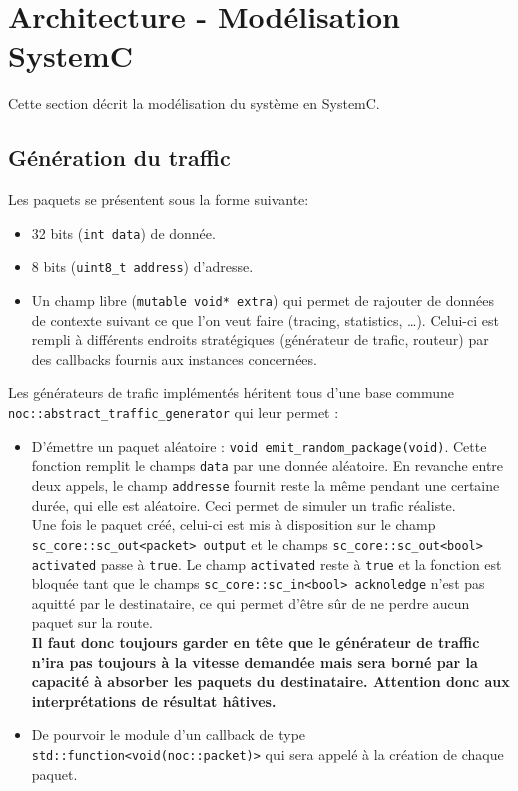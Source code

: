 \section{Architecture - Modélisation SystemC}

Cette section décrit la modélisation du système en SystemC.

\subsection{Génération du traffic}

Les paquets se présentent sous la forme suivante:
\begin{itemize}
  \item 32 bits (\texttt{int data}) de donnée.
  \item 8 bits (\texttt{uint8\_t address}) d'adresse.
  \item Un champ libre (\texttt{mutable void* extra}) qui permet de rajouter de
    données de contexte suivant ce que l'on veut faire (tracing, statistics,
    \ldots). Celui-ci est rempli à différents endroits stratégiques
    (générateur de trafic, routeur) par des callbacks fournis aux instances
    concernées.
\end{itemize}

\vspace{0.5cm}

Les générateurs de trafic implémentés héritent tous d'une base commune \\
\texttt{noc::abstract\_traffic\_generator} qui leur permet :
\begin{itemize}
  \item D'émettre un paquet aléatoire : \texttt{void
    emit\_random\_package(void)}. Cette fonction remplit le champs \texttt{data}
    par une donnée aléatoire. En revanche entre deux appels, le champ
    \texttt{addresse} fournit reste la même pendant une certaine durée, qui elle
    est aléatoire. Ceci permet de simuler un trafic réaliste. \\
    Une fois le paquet créé, celui-ci est mis à disposition sur le champ
    \texttt{sc\_core::sc\_out<packet> output} et le champs
    \texttt{sc\_core::sc\_out<bool> activated} passe à \texttt{true}. Le champ
    \texttt{activated} reste à \texttt{true} et la fonction est bloquée tant que le champs
    \texttt{sc\_core::sc\_in<bool> acknoledge} n'est pas aquitté par le
    destinataire, ce qui permet d'être sûr de ne perdre aucun paquet sur la
    route. \\
    \textbf{Il faut donc toujours garder en tête que le générateur de traffic n'ira pas toujours
      à la vitesse demandée mais sera borné par la capacité à absorber les
      paquets du destinataire. Attention donc aux interprétations de résultat
    hâtives.}
  \item De pourvoir le module d'un callback de type
    \texttt{std::function<void(noc::packet)>} qui sera appelé à la création de
    chaque paquet.
\end{itemize}


